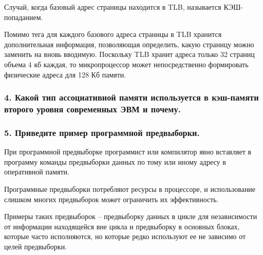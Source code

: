 Случай, когда базовый адрес страницы находится в TLB, называется КЭШ-попаданием. 

Помимо тега для каждого базового адреса страницы в TLB хранится дополнительная информация, позволяющая определить, какую страницу можно заменить на вновь вводимую. Поскольку TLB хранит адреса только 32 страниц объема 4 кб каждая, то микропроцессор может непосредственно формировать физические адреса для 128 Кб памяти.

\subsubsection{4. Какой тип ассоциативной памяти используется в кэш-памяти второго уровня современных ЭВМ и почему.}

\subsubsection{5. Приведите пример программной предвыборки.}

При программной предвыборке программист или компилятор явно вставляет в программу команды предвыборки данных по тому или иному адресу в оперативной памяти. 

Программные предвыборки потребляют ресурсы в процессоре, и использование слишком многих предвыборок может ограничить их эффективность. 

Примеры таких предвыборок -- предвыборку данных в цикле для независимости от информации находящейся вне цикла и предвыборку в основных блоках, которые часто исполняются, но которые редко используют ее не зависимо от целей предвыборки.
